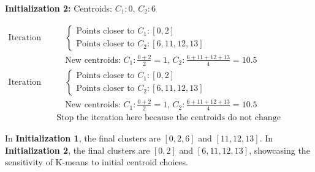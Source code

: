 \documentclass{article}
\begin{document}
\textbf{Initialization 2:} Centroids: $C_1: 0$, $C_2: 6$

\begin{align*}
\text{Iteration 1:} & \quad 
    \begin{cases} 
    \text{Points closer to } C_1: [0, 2] \\
    \text{Points closer to } C_2: [6, 11, 12, 13] 
    \end{cases} \\
& \quad \text{New centroids: } 
    C_1: \frac{0+2}{2} = 1, \, 
    C_2: \frac{6+11+12+13}{4} = 10.5\\
\text{Iteration 2:} & \quad 
    \begin{cases} 
    \text{Points closer to } C_1: [0, 2] \\
    \text{Points closer to } C_2: [6, 11, 12, 13] 
    \end{cases} \\
& \quad \text{New centroids: } 
    C_1: \frac{0+2}{2} = 1, \, 
    C_2: \frac{6+11+12+13}{4} = 10.5 \\
& \text{Stop the iteration here because the centroids do not change anymore.}
\end{align*}

In \textbf{Initialization 1}, the final clusters are $[0, 2, 6]$ and $[11, 12, 13]$. In \textbf{Initialization 2}, the final clusters are $[0, 2]$ and $[6, 11, 12, 13]$, showcasing the sensitivity of K-means to initial centroid choices.
\end{document}
